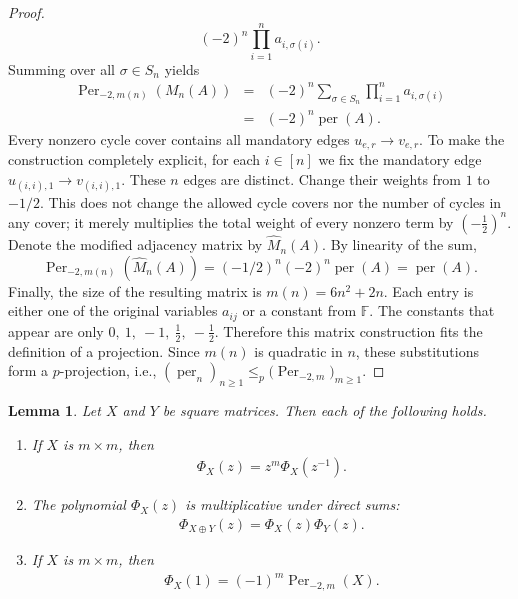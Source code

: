 \documentclass[11pt,a4paper]{article}
\newtheorem{lemma}[theorem]{Lemma}
\begin{document}
\begin{proof}
\[
  (-2)^n\prod_{i=1}^n a_{i,\sigma(i)}.
\]
Summing over all $\sigma\in S_n$ yields
\begin{eqnarray*}
  \operatorname{Per}_{-2,m(n)}(M_n(A))
  &=&(-2)^n\sum_{\sigma\in S_n}\prod_{i=1}^n a_{i,\sigma(i)}\\
  &=&(-2)^n\operatorname{per}(A).
\end{eqnarray*}
Every nonzero cycle cover contains all mandatory edges $u_{e,r}\to v_{e,r}$. To make the construction completely explicit, for each $i\in[n]$ we fix the mandatory edge $u_{(i,i),1}\longrightarrow v_{(i,i),1}$. These $n$ edges are distinct. Change their weights from $1$ to $-1/2$. This does not change the allowed cycle covers nor the number of cycles in any cover; it merely multiplies the total weight of every nonzero term by $\left(-\frac12\right)^n$.
Denote the modified adjacency matrix by $\widehat M_n(A)$. By linearity of the sum,
\[
  \operatorname{Per}_{-2,m(n)}(\widehat M_n(A))
  =
  (-1/2)^n(-2)^n\operatorname{per}(A)
  =
  \operatorname{per}(A).
\]
Finally, the size of the resulting matrix is $m(n)=6n^2+2n$. Each entry is either one of the original variables $a_{ij}$ or a constant from $\mathbb{F}$. The constants that appear are only
$0,\ 1,\ -1,\ \frac12,\ -\frac12$. Therefore this matrix construction fits the definition of a projection. Since $m(n)$ is quadratic in $n$, these substitutions form a $p$-projection, i.e.,
$(\operatorname{per}_n)_{n\geq1}\leq_p\bigl(\operatorname{Per}_{-2,m}\bigr)_{m\geq1}$.
\end{proof}

\begin{lemma}\label{lem2.7}
Let $X$ and $Y$ be square matrices. Then each of the following holds.
\begin{enumerate}
\renewcommand{\labelenumi}{(\roman{enumi})}
  \item If $X$ is $m\times m$, then
  \begin{eqnarray*}
    \Phi_X(z)=z^m\Phi_X(z^{-1}).
  \end{eqnarray*}
  \item The polynomial $\Phi_X(z)$ is multiplicative under direct sums:
  \begin{eqnarray*}
    \Phi_{X\oplus Y}(z)=\Phi_X(z)\Phi_Y(z).
  \end{eqnarray*}
  \item If $X$ is $m\times m$, then
  \begin{eqnarray*}
    \Phi_X(1)=(-1)^m\operatorname{Per}_{-2,m}(X).
  \end{eqnarray*}
\end{enumerate}
\end{lemma}
\end{document}
